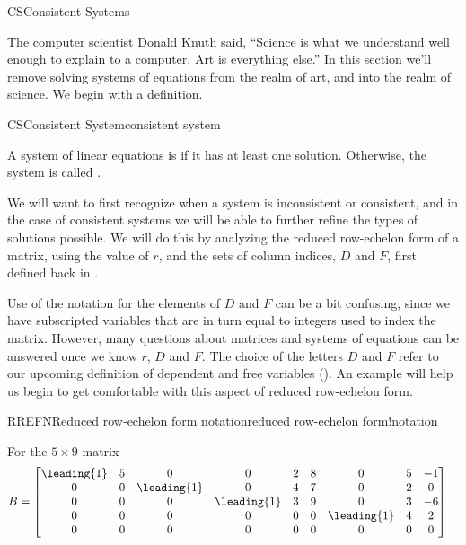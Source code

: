 \begin{subsect}{CS}{Consistent Systems}
%
\begin{para}The computer scientist Donald Knuth said, ``Science is what we understand well enough to explain to a computer. Art is everything else.''  In this section we'll remove solving systems of equations from the realm of art, and into the realm of science.  We begin with a definition.\end{para}
%
\begin{definition}{CS}{Consistent System}{consistent system}
\begin{para}A system of linear equations is  if it has at least one solution.  Otherwise, the system is called .\end{para}
\end{definition}
%
\begin{para}We will want to first recognize when a system is inconsistent or consistent, and in the case of consistent systems we will be able to further refine the types of solutions possible.  We will do this by analyzing the reduced row-echelon form of a matrix, using the value of $r$, and the sets of column indices, $D$ and $F$, first defined back in .\end{para}
%
\begin{para}Use of the notation for the elements of $D$ and $F$ can be a bit confusing, since we have subscripted variables that are in turn equal to integers used to index the matrix.  However, many questions about matrices and systems of equations can be answered once we know $r$, $D$ and $F$.  The choice of the letters $D$ and $F$ refer to our upcoming definition of dependent and free variables ().  An example will help us begin to get comfortable with this aspect of reduced row-echelon form.\end{para}
%
\begin{example}{RREFN}{Reduced row-echelon form notation}{reduced row-echelon form!notation}
\begin{para}For the $5\times 9$ matrix
\begin{align*}
B&=
\begin{bmatrix}
\leading{1}&5&0&0&2&8&0&5&-1\\
0&0&\leading{1}&0&4&7&0&2&0\\
0&0&0&\leading{1}&3&9&0&3&-6\\
0&0&0&0&0&0&\leading{1}&4&2\\
0&0&0&0&0&0&0&0&0
\end{bmatrix}

\end{align*}
\end{para}
\end{example}
\end{subsect}
